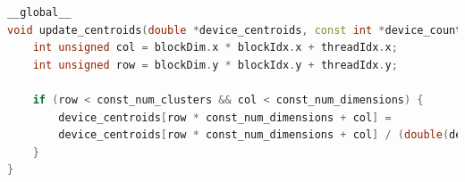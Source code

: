 \documentclass[10pt,twocolumn,letterpaper]{article}
\begin{document}
\begin{lstlisting}[language=c++, caption=Aggiornamento: \textit{update\_centroids}, label=code:CUDAupdatecentroids]
__global__
void update_centroids(double *device_centroids, const int *device_count) {
	int unsigned col = blockDim.x * blockIdx.x + threadIdx.x;
	int unsigned row = blockDim.y * blockIdx.y + threadIdx.y;
	
	if (row < const_num_clusters && col < const_num_dimensions) {
		device_centroids[row * const_num_dimensions + col] =
		device_centroids[row * const_num_dimensions + col] / (double(device_count[row]) / const_num_dimensions);
	}
}
\end{lstlisting}





\end{document}
